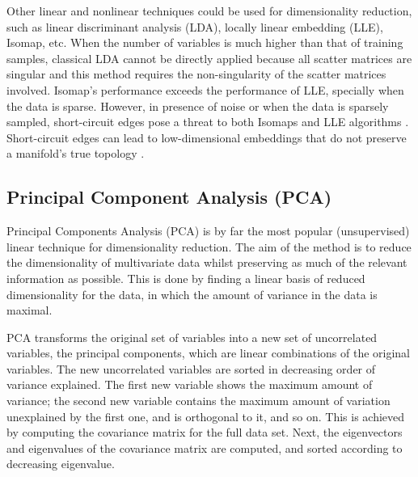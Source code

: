 \documentclass[a4paper,fleqn,usenatbib]{mnras}
\begin{document}
{Other linear and nonlinear techniques could be used for dimensionality 
reduction, such as linear discriminant analysis (LDA), locally linear 
embedding (LLE), Isomap, etc. When the number of variables is much 
higher than that of training samples, classical LDA cannot be directly 
applied because all scatter matrices are singular and this method 
requires the non-singularity of the scatter matrices involved. 
Isomap's performance exceeds the performance of LLE, specially when 
the data is sparse. However, in presence of noise or when the data 
is sparsely sampled, short-circuit edges pose a threat to both Isomaps 
and LLE algorithms \citep{saxena:04}. Short-circuit edges can lead to 
low-dimensional embeddings that do not preserve a manifold's true topology \citep{balasubramanianISOMAP:02}.



\subsection{Principal Component Analysis (PCA)}

Principal Components Analysis (PCA) \citep{hotelling:33,pearson:01} is
by far the most popular (unsupervised) linear technique for
dimensionality reduction. The aim of the method is to reduce the
dimensionality of multivariate data whilst preserving as much of the
relevant information as possible. This is done by finding a linear
basis of reduced dimensionality for the data, in which the amount of
variance in the data is maximal.

PCA transforms the original set of variables into a new set of
uncorrelated variables, the principal components, which are linear
combinations of the original variables. The new uncorrelated variables
are sorted in decreasing order of variance explained. The first
new variable shows the maximum amount of variance; the second
new variable contains the maximum amount of variation unexplained by
the first one, and is orthogonal to it, and so on.  This is
achieved by computing the covariance matrix for the full data
set. Next, the eigenvectors and eigenvalues of the covariance matrix
are computed, and sorted according to decreasing eigenvalue.

}
\end{document}
